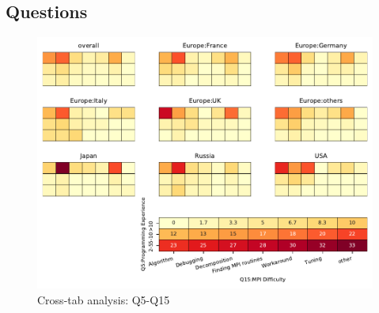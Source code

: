 
\subsection{Questions}


\begin{figure}
\begin{center}
\includegraphics[width=12cm]{../pdfs/Q5-Q15.pdf}
\caption{Cross-tab analysis: Q5-Q15}
\label{fig:Q5-Q15}
\end{center}
\end{figure}
